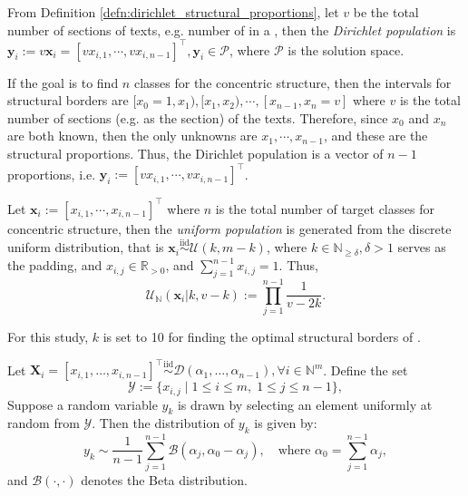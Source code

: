 \begin{defn}\label{defn:dirichlet_population}
    From Definition \ref{defn:dirichlet_structural_proportions}, let $v$ be the total number of sections of texts, e.g. number of   in a  , then the \textit{Dirichlet population} is $\mathbf{y}_i:=v\mathbf{x}_i=[vx_{i,1},\cdots,vx_{i,n-1}]^{\top},\mathbf{y}_i\in\mathscr{P}$, where $\mathscr{P}$ is the solution space.
\end{defn}
\begin{remark}
    If the goal is to find $n$ classes for the concentric structure, then the intervals for structural borders are $[x_0=1,x_1),[x_1,x_2),\cdots,[x_{n-1},x_n=v]$ where $v$ is the total number of sections (e.g.  \textnormal{} as the section) of the texts. Therefore, since $x_0$ and $x_n$ are both known, then the only unknowns are $x_1,\cdots,x_{n-1}$, and these are the structural proportions. Thus, the Dirichlet population is a vector of $n-1$ proportions, i.e. $\mathbf{y}_i:=[vx_{i,1},\cdots,vx_{i,n-1}]^{\top}$.
\end{remark}
\begin{defn}\label{defn:discrete_uniform_population}
    Let $\mathbf{x}_i:=[x_{i,1},\cdots,x_{i,n-1}]^{\top}$ where $n$ is the total number of target classes for concentric structure, then the \textit{uniform population} is generated from the discrete uniform distribution, that is $\mathbf{x}_i\overset{\text{iid}}{\sim}\mathcal{U}(k,m-k)$, where $k\in\mathbb{N}_{\geq \delta},\delta>1$ serves as the padding, and $x_{i,j}\in\mathbb{R}_{>0}$, and $\sum_{j=1}^{n-1}x_{i,j}=1$. Thus,
    \begin{equation}
        \mathcal{U}_{\mathbb{N}}(\mathbf{x}_i|k,v-k):=\prod_{j=1}^{n-1}\frac{1}{v-2k}.
    \end{equation}
\end{defn}
\begin{remark}
    For this study, $k$ is set to 10 for finding the optimal structural borders of  \textnormal{}.
\end{remark}
\begin{prop}\label{prop:mixture_beta}
Let $\mathbf{X}_i = [x_{i,1}, \dots, x_{i,n-1}]^\top\overset{\text{iid}}{\sim}\mathcal{D}(\alpha_1, \dots, \alpha_{n-1}), \forall i \in\mathbb{N}^{m}$. Define the set
\[
\mathscr{Y} := \{x_{i,j} \mid 1 \le i \le m,\; 1 \le j \le n-1\},
\]
Suppose a random variable $y_k$ is drawn by selecting an element uniformly at random from $\mathscr{Y}$. Then the distribution of $y_k$ is given by:
\[
y_k \sim \frac{1}{n-1} \sum_{j=1}^{n-1} \mathcal{B}(\alpha_j, \alpha_0 - \alpha_j), \quad \text{where } \alpha_0 = \sum_{j=1}^{n-1} \alpha_j,
\]
and $\mathcal{B}(\cdot,\cdot)$ denotes the Beta distribution.
\end{prop}
    
